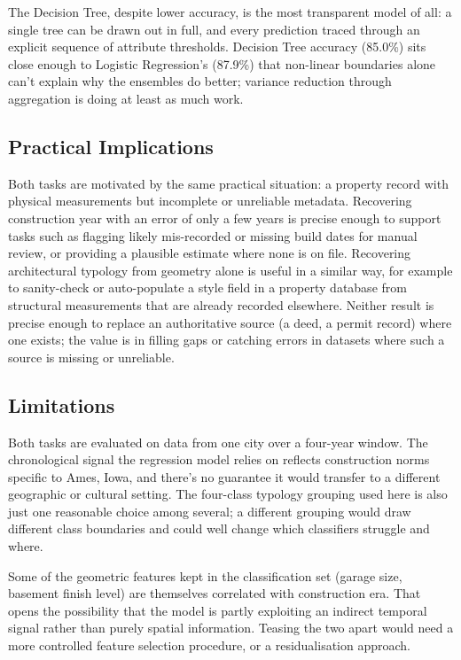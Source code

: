 \documentclass[11pt,a4paper]{article}
\begin{document}
The Decision Tree, despite lower accuracy, is the most transparent model
of all: a single tree can be drawn out in full, and every prediction
traced through an explicit sequence of attribute thresholds. Decision
Tree accuracy (85.0\%) sits close enough to Logistic Regression's
(87.9\%) that non-linear boundaries alone can't explain why the
ensembles do better; variance reduction through aggregation is doing at
least as much work.

\subsection{Practical Implications}\label{practical-implications}

Both tasks are motivated by the same practical situation: a property
record with physical measurements but incomplete or unreliable metadata.
Recovering construction year with an error of only a few years is
precise enough to support tasks such as flagging likely mis-recorded or
missing build dates for manual review, or providing a plausible estimate
where none is on file. Recovering architectural typology from geometry
alone is useful in a similar way, for example to sanity-check or
auto-populate a style field in a property database from structural
measurements that are already recorded elsewhere. Neither result is
precise enough to replace an authoritative source (a deed, a permit
record) where one exists; the value is in filling gaps or catching
errors in datasets where such a source is missing or unreliable.

\subsection{Limitations}\label{limitations}

Both tasks are evaluated on data from one city over a four-year window.
The chronological signal the regression model relies on reflects
construction norms specific to Ames, Iowa, and there's no guarantee it
would transfer to a different geographic or cultural setting. The
four-class typology grouping used here is also just one reasonable
choice among several; a different grouping would draw different class
boundaries and could well change which classifiers struggle and where.

Some of the geometric features kept in the classification set (garage
size, basement finish level) are themselves correlated with construction
era. That opens the possibility that the model is partly exploiting an
indirect temporal signal rather than purely spatial information. Teasing
the two apart would need a more controlled feature selection procedure,
or a residualisation approach.
\end{document}
